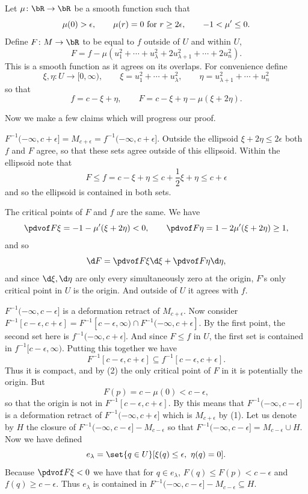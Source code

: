     Let $\mu\colon\bR\to\bR$ be a smooth function such that
    $$ \mu(0) > \epsilon,\qquad \mu(r) = 0 \hbox{ for $r\geq2\epsilon$},\qquad -1 < \mu' \leq 0 . $$
    Define $F\colon M\to\bR$ to be equal to $f$ outside of $U$ and within $U$,
    $$ F = f - \mu(u_1^2 + \cdots + u_\lambda^2 + 2u_{\lambda+1}^2 + \cdots + 2u_n^2) . $$
    This is a smooth function as it agrees on its overlaps.
    For convenience define
    $$ \xi,\eta\colon U\to[0,\infty),\qquad \xi = u_1^2 + \cdots + u_\lambda^2,\qquad
    \eta = u_{\lambda+1}^2 + \cdots + u_n^2 $$
    so that
    $$ f = c - \xi + \eta,\qquad F = c - \xi + \eta - \mu(\xi + 2\eta) . $$

    Now we make a few claims which will progress our proof.
    \benum
        \item $F^{-1}(-\infty,c+\epsilon]=M_{c+\epsilon}=f^{-1}(-\infty,c+\epsilon]$.
        Outside the ellipsoid $\xi+2\eta\leq2\epsilon$ both $f$ and $F$ agree, so that
        these sets agree outside of this ellipsoid.
        Within the ellipsoid note that
        $$ F \leq f = c - \xi + \eta \leq c + \frac12\xi + \eta \leq c + \epsilon $$
        and so the ellipsoid is contained in both sets.

        \item The critical points of $F$ and $f$ are the same.
        We have
        $$ \pdvof F\xi = - 1 - \mu'(\xi + 2\eta) < 0,\qquad
        \pdvof F\eta = 1 - 2\mu'(\xi + 2\eta) \geq 1 , $$
        and so
        $$ \d F = \pdvof F\xi\d\xi + \pdvof F\eta\d\eta , $$
        and since $\d\xi,\d\eta$ are only every simultaneously zero at the origin, $F$'s only critical
        point in $U$ is the origin.
        And outside of $U$ it agrees with $f$.

        \item $F^{-1}(-\infty,c-\epsilon]$ is a deformation retract of $M_{c+\epsilon}$.
        Now consider $F^{-1}[c-\epsilon,c+\epsilon]=F^{-1}[c-\epsilon,\infty)\cap F^{-1}(-\infty,c+\epsilon]$.
        By the first point, the second set here is $f^{-1}(-\infty,c+\epsilon]$.
        And since $F\leq f$ in $U$, the first set is contained in $f^{-1}[c-\epsilon,\infty)$.
        Putting this together we have
        $$ F^{-1}[c-\epsilon,c+\epsilon] \subseteq f^{-1}[c-\epsilon,c+\epsilon] . $$
        Thus it is compact, and by (2) the only critical point of $F$ in it is potentially the origin.
        But
        $$ F(p) = c - \mu(0) < c - \epsilon , $$
        so that the origin is not in $F^{-1}[c-\epsilon,c+\epsilon]$.
        By  this means that $F^{-1}(-\infty,c-\epsilon]$ is a deformation
        retract of $F^{-1}(-\infty,c+\epsilon]$ which is $M_{c+\epsilon}$ by (1).
    \eenum
    Let us denote by $H$ the closure of $F^{-1}(-\infty,c-\epsilon]-M_{c-\epsilon}$ so that
    $F^{-1}(-\infty,c-\epsilon]=M_{c-\epsilon}\cup H$.
    Now we have defined
    $$ e_\lambda = \set{q\in U}[\xi(q)\leq\epsilon,\ \eta(q)=0] . $$
    Because $\pdvof F\xi<0$ we have that for $q\in e_\lambda$, $F(q)\leq F(p)<c-\epsilon$
    and $f(q)\geq c-\epsilon$.
    Thus $e_\lambda$ is contained in $F^{-1}(-\infty,c-\epsilon]-M_{c-\epsilon}\subseteq H$.

